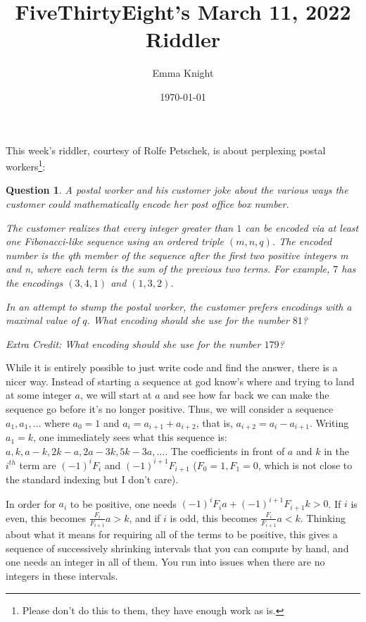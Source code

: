 \documentclass[11pt]{article}
\title{FiveThirtyEight's March 11, 2022 Riddler}
\author{Emma Knight}
\date{\today}
\newtheorem{question}[theorem]{Question}
\theoremstyle{definition}
\begin{document}
\maketitle
This week's riddler, courtesy of Rolfe Petschek, is about perplexing postal workers\footnote{Please don't do this to them, they have enough work as is.}:
\begin{question}
A postal worker and his customer joke about the various ways the customer could mathematically encode her post office box number.

The customer realizes that every integer greater than $1$ can be encoded via at least one Fibonacci-like sequence using an ordered triple $(m, n, q)$. The encoded number is the qth member of the sequence after the first two positive integers m and n, where each term is the sum of the previous two terms. For example, $7$ has the encodings $(3, 4, 1)$ and $(1, 3, 2)$.

In an attempt to stump the postal worker, the customer prefers encodings with a maximal value of $q$. What encoding should she use for the number $81$?

\emph{Extra Credit}: What encoding should she use for the number $179$?
\end{question}

While it is entirely possible to just write code and find the answer, there is a nicer way.  Instead of starting a sequence at god know's where and trying to land at some integer $a$, we will start at $a$ and see how far back we can make the sequence go before it's no longer positive.  Thus, we will consider a sequence $a_1, a_1, \ldots$ where $a_0 = 1$ and $a_i = a_{i+1} + a_{i+2}$, that is, $a_{i+2} = a_i-a_{i+1}$.  Writing $a_1 = k$, one immediately sees what this sequence is: $a, k, a-k, 2k-a, 2a-3k, 5k-3a, \ldots$.  The coefficients in front of $a$ and $k$ in the $i^{th}$ term are $(-1)^i F_{i}$ and $(-1)^{i+1}F_{i+1}$ ($F_0 = 1, F_1 = 0$, which is not close to the standard indexing but I don't care).

In order for $a_i$ to be positive, one needs $(-1)^i F_{i}a + (-1)^{i+1}F_{i+1}k > 0$.  If $i$ is even, this becomes $\frac{F_i}{F_{i+1}}a > k$, and if $i$ is odd, this becomes $\frac{F_i}{F_{i+1}}a < k$.  Thinking about what it means for requiring all of the terms to be positive, this gives a sequence of successively shrinking intervals that you can compute by hand, and one needs an integer in all of them.  You run into issues when there are no integers in these intervals.
\end{document}
